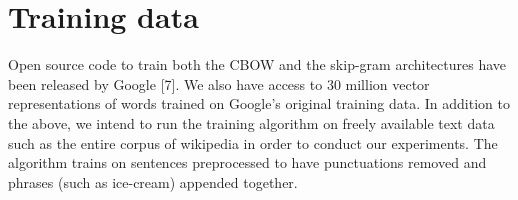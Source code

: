\section{Training data}

Open source code to train both the CBOW and the skip-gram architectures have been released by Google [7]. 
We also have access to 30 million vector representations of words trained on Google’s original training data. 
In addition to the above, we intend to run the training algorithm on freely available text data such as the entire corpus of wikipedia in order to conduct our experiments. 
The algorithm trains on sentences preprocessed to have punctuations removed and phrases (such as ice-cream) appended together. 

